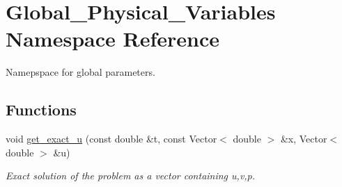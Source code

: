\hypertarget{namespaceGlobal__Physical__Variables}{}\section{Global\+\_\+\+Physical\+\_\+\+Variables Namespace Reference}
\label{namespaceGlobal__Physical__Variables}


Namepspace for global parameters.  


\subsection*{Functions}
\begin{DoxyCompactItemize}
\item 
void \hyperlink{namespaceGlobal__Physical__Variables_af29d0fbf7264555610176a1fc931591a}{get\+\_\+exact\+\_\+u} (const double \&t, const Vector$<$ double $>$ \&x, Vector$<$ double $>$ \&u)
\begin{DoxyCompactList}\small\item\em Exact solution of the problem as a vector containing u,v,p. \end{DoxyCompactList}\end{DoxyCompactItemize}
